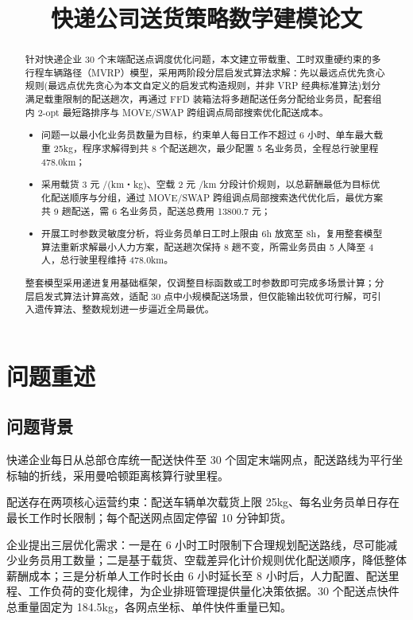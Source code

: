 \documentclass[withoutpreface,bwprint]{cumcmthesis} %
\title{快递公司送货策略数学建模论文}
\begin{document}
 \maketitle
 \begin{abstract}
针对快递企业 30 个末端配送点调度优化问题，本文建立带载重、工时双重硬约束的多行程车辆路径（MVRP）模型，采用两阶段分层启发式算法求解：先以最远点优先贪心规则(最远点优先贪心为本文自定义的启发式构造规则，并非 VRP 经典标准算法)划分满足载重限制的配送趟次，再通过 FFD 装箱法将多趟配送任务分配给业务员，配套组内 2-opt 最短路排序与 MOVE/SWAP 跨组调点局部搜索优化配送成本。
\begin{itemize}
    \item 问题一以最小化业务员数量为目标，约束单人每日工作不超过 6 小时、单车最大载重 25kg，程序求解得到共 8 个配送趟次，最少配置 5 名业务员，全程总行驶里程 478.0km；
    \item 采用载货 3 元 /(km・kg)、空载 2 元 /km 分段计价规则，以总薪酬最低为目标优化配送顺序与分组，通过 MOVE/SWAP 跨组调点局部搜索迭代优化后，最优方案共 9 趟配送，需 6 名业务员，配送总费用 13800.7 元；
    \item 开展工时参数灵敏度分析，将业务员单日工时上限由 6h 放宽至 8h，复用整套模型算法重新求解最小人力方案，配送趟次保持 8 趟不变，所需业务员由 5 人降至 4 人，总行驶里程维持 478.0km。
\end{itemize}

整套模型采用递进复用基础框架，仅调整目标函数或工时参数即可完成多场景计算；分层启发式算法计算高效，适配 30 点中小规模配送场景，但仅能输出较优可行解，可引入遗传算法、整数规划进一步逼近全局最优。



\end{abstract}



\section{问题重述}
\subsection{问题背景}
快递企业每日从总部仓库统一配送快件至 30 个固定末端网点，配送路线为平行坐标轴的折线，采用曼哈顿距离核算行驶里程。
\par 配送存在两项核心运营约束：配送车辆单次载货上限 25kg、每名业务员单日存在最长工作时长限制；每个配送网点固定停留 10 分钟卸货。
\par 企业提出三层优化需求：一是在 6 小时工时限制下合理规划配送路线，尽可能减少业务员用工数量；二是基于载货、空载差异化计价规则优化配送顺序，降低整体薪酬成本；三是分析单人工作时长由 6 小时延长至 8 小时后，人力配置、配送里程、工作负荷的变化规律，为企业排班管理提供量化决策依据。30 个配送点快件总重量固定为 184.5kg，各网点坐标、单件快件重量已知。
\end{document}
